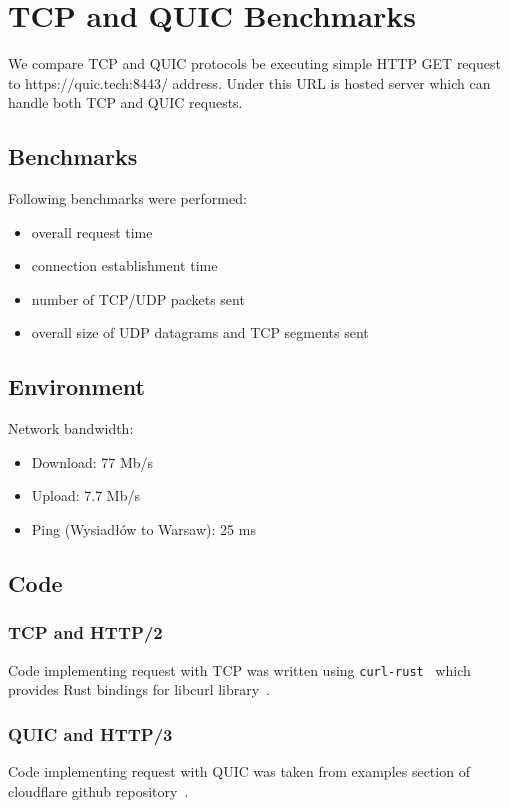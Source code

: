 
\section{TCP and QUIC Benchmarks}
\label{sec:tcp-quic-benchmarks}

We compare TCP and QUIC protocols be executing simple HTTP GET request to
https://quic.tech:8443/ address.
Under this URL is hosted server which can handle both TCP and QUIC requests.

\subsection{Benchmarks}
\label{subsec:benchmarks}
Following benchmarks were performed:
\begin{itemize}
    \item overall request time
    \item connection establishment time
    \item number of TCP/UDP packets sent
    \item overall size of UDP datagrams and TCP segments sent
\end{itemize}

\subsection{Environment}
\label{subsec:environment}
Network bandwidth:
\begin{itemize}
    \item Download: 77 Mb/s
    \item Upload: 7.7 Mb/s
    \item Ping (Wysiadłów to Warsaw): 25 ms
\end{itemize}

\subsection{Code}
\label{subsec:code}

\subsubsection{TCP and HTTP/2}
Code implementing request with TCP was written using \texttt{curl-rust}~\cite{curl-rust}
which provides Rust bindings for libcurl library~\cite{curl}.

\subsubsection{QUIC and HTTP/3}
Code implementing request with QUIC was taken from examples section
of cloudflare github repository~\cite{quiche}.

